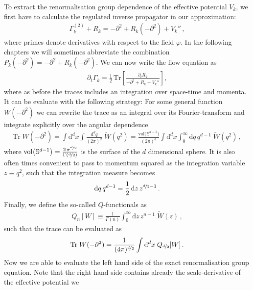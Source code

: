 \documentclass[11pt]{book}
\newcommand{\Tr}{\mathrm{Tr}}
\numberwithin{equation}{chapter}
\begin{document}
To extract the renormalisation group dependence of the effective
potential $V_k$, we first have to calculate the regulated inverse
propagator in our approximation:
\begin{align}
  \Gamma_k^{(2)} + R_k = -\partial^2 + R_k(-\partial^2) + V_k'' \,,
\end{align}
where primes denote derivatives with respect to the field $\varphi$.
In the following chapters we will sometimes abbreviate the combination
$P_k(-\partial^2) = -\partial^2 + R_k(-\partial^2)$. We can now write
the flow equation as
\begin{align}
  \partial_t \Gamma_k = \frac 12 \,
  \Tr \left[
    \frac{ \partial_t R_k }{ -\partial^2 + R_k + V_k'' }
  \right] ,
\end{align}
where as before the traces includes an integration over space-time
and momenta. It can be evaluate with the following strategy: For
some general function $W(-\partial^2)$ we can rewrite the trace as an
integral over its Fourier-transform and integrate explicitly over
the angular dependence
\begin{align}
  \Tr \; W(-\partial^2)
  =
  \int \mathrm d^dx
  \int \frac{ \mathrm d^dq }{ (2\pi)^d } \;
  \tilde W(q^2)
  =
  \frac{ \mathrm{vol} \big( \mathbb S^{d-1}  \big) }{ (2\pi)^d }
  \int \mathrm d^dx
  \int_0^\infty \mathrm dq \, q^{d-1} \;
  \tilde W(q^2) \,,
\end{align}
where
$\mathrm{vol} \big( \mathbb S^{d-1}  \big)
= \frac{ 2 \, \pi^{\nicefrac d2} }{ \Gamma \left( \nicefrac d2 \right) }$
is the surface of the $d$ dimensional sphere.
It is also often times convenient to pass to momentum squared
as the integration variable $z \equiv q^2$,
such that the integration measure becomes
\begin{align}
  \mathrm dq \, q^{d-1} =
  \frac 12 \, \mathrm dz \, z^{\nicefrac d2 - 1} \,.
\end{align}
Finally, we define the so-called $Q$-functionals as
\begin{align}
  Q_n[W]
  \equiv
  \frac{ 1 }{ \Gamma(n) }
  \int_0^\infty \mathrm dz \, z^{n-1} \; \tilde W(z) \,,
\end{align}
such that the trace can be evaluated as
\begin{align}
  \Tr \; W(-\partial^2)
  =
  \frac{1}{ (4\pi)^{\nicefrac d2} }
  \int \mathrm d^dx \; Q_{\nicefrac d2}[W] \,.
\end{align}
Now we are able to evaluate the left hand side of the exact
renormalisation group equation. Note that the right hand
side contains already the scale-derivative of the effective potential we
\end{document}
